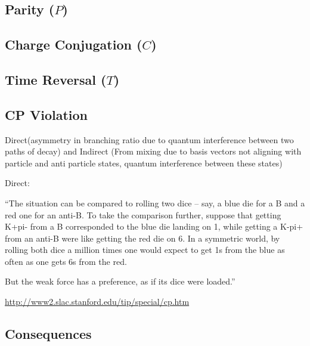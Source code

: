 \subsection{Parity ($P$)}

\subsection{Charge Conjugation ($C$)}

\subsection{Time Reversal ($T$)}

\subsection{CP Violation}

Direct(asymmetry in branching ratio due to quantum interference between two paths of decay) and Indirect (From mixing due to basis vectors not aligning with particle and anti particle states, quantum interference between these states)

Direct:

``The situation can be compared to rolling two dice – say, a blue die for a B and a red one for an anti-B.  To take the comparison further, suppose that getting K+pi- from a B corresponded to the blue die landing on 1, while getting a K-pi+ from an anti-B were like getting the red die on 6. In a symmetric world, by rolling both dice a million times one would expect to get 1s from the blue as often as one gets 6s from the red.

But the weak force has a preference, as if its dice were loaded.''

\url{http://www2.slac.stanford.edu/tip/special/cp.htm}


\subsection{Consequences}

